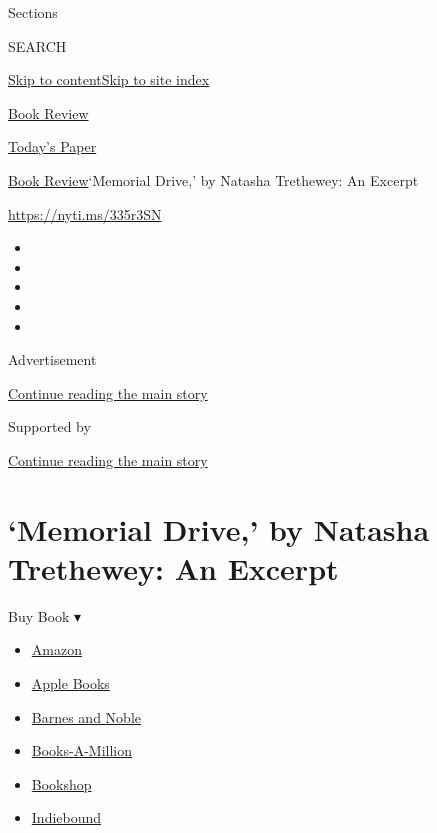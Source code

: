 Sections

SEARCH

\protect\hyperlink{site-content}{Skip to
content}\protect\hyperlink{site-index}{Skip to site index}

\href{https://www.nytimes.com/section/books/review}{Book Review}

\href{https://myaccount.nytimes.com/auth/login?response_type=cookie\&client_id=vi}{}

\href{https://www.nytimes.com/section/todayspaper}{Today's Paper}

\href{/section/books/review}{Book Review}\textbar{}`Memorial Drive,' by
Natasha Trethewey: An Excerpt

\url{https://nyti.ms/335r3SN}

\begin{itemize}
\item
\item
\item
\item
\item
\end{itemize}

Advertisement

\protect\hyperlink{after-top}{Continue reading the main story}

Supported by

\protect\hyperlink{after-sponsor}{Continue reading the main story}

\hypertarget{memorial-drive-by-natasha-trethewey-an-excerpt}{%
\section{`Memorial Drive,' by Natasha Trethewey: An
Excerpt}\label{memorial-drive-by-natasha-trethewey-an-excerpt}}

Buy Book ▾

\begin{itemize}
\tightlist
\item
  \href{https://www.amazon.com/gp/search?index=books\&tag=NYTBSREV-20\&field-keywords=Memorial+Drive\%3A+A+Daughter\%27s+Memoir+Natastha+Trethewey}{Amazon}
\item
  \href{https://du-gae-books-dot-nyt-du-prd.appspot.com/buy?title=Memorial+Drive\%3A+A+Daughter\%27s+Memoir\&author=Natastha+Trethewey}{Apple
  Books}
\item
  \href{https://www.anrdoezrs.net/click-7990613-11819508?url=https\%3A\%2F\%2Fwww.barnesandnoble.com\%2Fs\%2FMemorial+Drive\%3A+A+Daughter\%27s+Memoir+Natastha+Trethewey}{Barnes
  and Noble}
\item
  \href{https://www.anrdoezrs.net/click-7990613-35140?url=https\%3A\%2F\%2Fwww.booksamillion.com\%2Fsearch\%3Fquery\%3DMemorial\%2BDrive\%253A\%2BA\%2BDaughter\%2527s\%2BMemoir\%2BNatastha\%2BTrethewey}{Books-A-Million}
\item
  \href{https://bookshop.org/books?keywords=Memorial+Drive\%3A+A+Daughter\%27s+Memoir}{Bookshop}
\item
  \href{https://www.indiebound.org/search/book?searchfor=Memorial+Drive\%3A+A+Daughter\%27s+Memoir+Natastha+Trethewey\&aff=NYT}{Indiebound}
\end{itemize}

